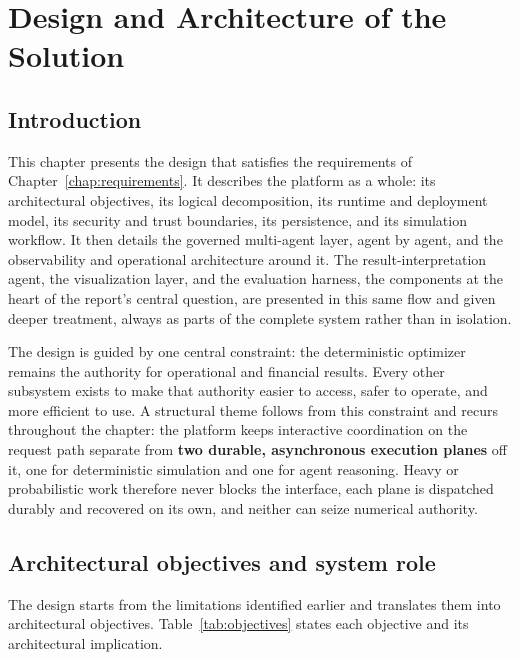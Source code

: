\chapter{Design and Architecture of the Solution}
\label{chap:design}

\section*{Introduction}

This chapter presents the design that satisfies the requirements of
Chapter~\ref{chap:requirements}. It describes the platform as a whole: its
architectural objectives, its logical decomposition, its runtime and deployment
model, its security and trust boundaries, its persistence, and its simulation
workflow. It then details the governed multi-agent layer, agent by agent, and the
observability and operational architecture around it. The result-interpretation
agent, the visualization layer, and the evaluation harness, the components at the
heart of the report's central question, are presented in this same flow and given
deeper treatment, always as parts of the complete system rather than in
isolation.

The design is guided by one central constraint: the deterministic optimizer
remains the authority for operational and financial results. Every other
subsystem exists to make that authority easier to access, safer to operate, and
more efficient to use. A structural theme follows from this constraint and recurs
throughout the chapter: the platform keeps interactive coordination on the request
path separate from \textbf{two durable, asynchronous execution planes} off it, one
for deterministic simulation and one for agent reasoning. Heavy or probabilistic
work therefore never blocks the interface, each plane is dispatched durably and
recovered on its own, and neither can seize numerical authority.

\section{Architectural objectives and system role}
\label{sec:arch-objectives}

The design starts from the limitations identified earlier and translates them into
architectural objectives. Table~\ref{tab:objectives} states each objective and its
architectural implication.

